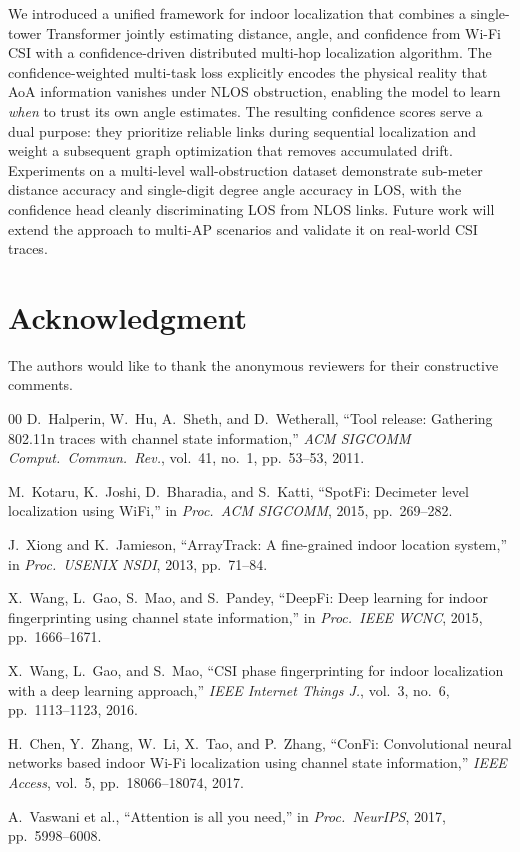 \documentclass[conference]{IEEEtran}
\begin{document}
We introduced a unified framework for indoor localization that combines a
single-tower Transformer jointly estimating distance, angle, and confidence
from Wi-Fi CSI with a confidence-driven distributed multi-hop localization
algorithm. The confidence-weighted multi-task loss explicitly encodes the
physical reality that AoA information vanishes under NLOS obstruction, enabling
the model to learn \emph{when} to trust its own angle estimates. The resulting
confidence scores serve a dual purpose: they prioritize reliable links during
sequential localization and weight a subsequent graph optimization that removes
accumulated drift. Experiments on a multi-level wall-obstruction dataset
demonstrate sub-meter distance accuracy and single-digit degree angle accuracy
in LOS, with the confidence head cleanly discriminating LOS from NLOS links.
Future work will extend the approach to multi-AP scenarios and validate it on
real-world CSI traces.

\section*{Acknowledgment}
The authors would like to thank the anonymous reviewers for their constructive
comments.

\begin{thebibliography}{00}
D.~Halperin, W.~Hu, A.~Sheth, and D.~Wetherall,
``Tool release: Gathering 802.11n traces with channel state information,''
\emph{ACM SIGCOMM Comput.\ Commun.\ Rev.}, vol.~41, no.~1, pp.~53--53, 2011.

M.~Kotaru, K.~Joshi, D.~Bharadia, and S.~Katti,
``SpotFi: Decimeter level localization using WiFi,''
in \emph{Proc.\ ACM SIGCOMM}, 2015, pp.~269--282.

J.~Xiong and K.~Jamieson,
``ArrayTrack: A fine-grained indoor location system,''
in \emph{Proc.\ USENIX NSDI}, 2013, pp.~71--84.

X.~Wang, L.~Gao, S.~Mao, and S.~Pandey,
``DeepFi: Deep learning for indoor fingerprinting using channel state
information,''
in \emph{Proc.\ IEEE WCNC}, 2015, pp.~1666--1671.

X.~Wang, L.~Gao, and S.~Mao,
``CSI phase fingerprinting for indoor localization with a deep learning
approach,''
\emph{IEEE Internet Things J.}, vol.~3, no.~6, pp.~1113--1123, 2016.

H.~Chen, Y.~Zhang, W.~Li, X.~Tao, and P.~Zhang,
``ConFi: Convolutional neural networks based indoor Wi-Fi localization using
channel state information,''
\emph{IEEE Access}, vol.~5, pp.~18066--18074, 2017.

A.~Vaswani et al.,
``Attention is all you need,''
in \emph{Proc.\ NeurIPS}, 2017, pp.~5998--6008.

\end{thebibliography}

\balance
\end{document}

